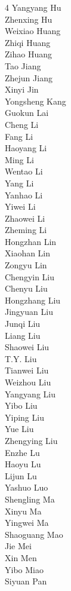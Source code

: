 \begin{multicols}{4}
Yangyang Hu\\
Zhenxing Hu\\
Weixiao Huang\\
Zhiqi Huang\\
Zihao Huang\\
Tao Jiang\\
Zhejun Jiang\\
Xinyi Jin\\
Yongsheng Kang\\
Guokun Lai\\
Cheng Li\\
Fang Li\\
Haoyang Li\\
Ming Li\\
Wentao Li\\
Yang Li\\
Yanhao Li\\
Yiwei Li\\
Zhaowei Li\\
Zheming Li\\
Hongzhan Lin\\
Xiaohan Lin\\
Zongyu Lin\\
Chengyin Liu\\
Chenyu Liu\\
Hongzhang Liu\\
Jingyuan Liu\\
Junqi Liu\\
Liang Liu\\
Shaowei Liu\\
T.Y. Liu\\
Tianwei Liu\\
Weizhou Liu\\
Yangyang Liu\\
Yibo Liu\\
Yiping Liu\\
Yue Liu\\
Zhengying Liu\\
Enzhe Lu\\
Haoyu Lu\\
Lijun Lu\\
Yashuo Luo\\
Shengling Ma\\
Xinyu Ma\\
Yingwei Ma\\
Shaoguang Mao\\
Jie Mei\\
Xin Men\\
Yibo Miao\\
Siyuan Pan\\

\end{multicols}
